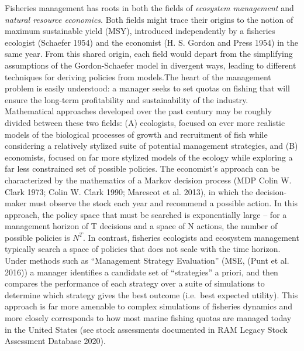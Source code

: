 \documentclass{article}
\begin{document}
Fisheries management has roots in both the fields of \emph{ecosystem
management} and \emph{natural resource economics}. Both fields might
trace their origins to the notion of maximum sustainable yield (MSY),
introduced independently by a fisheries ecologist (Schaefer 1954) and
the economist (H. S. Gordon and Press 1954) in the same year. From this
shared origin, each field would depart from the simplifying assumptions
of the Gordon-Schaefer model in divergent ways, leading to different
techniques for deriving policies from models.The heart of the management
problem is easily understood: a manager seeks to set quotas on fishing
that will ensure the long-term profitability and sustainability of the
industry. Mathematical approaches developed over the past century may be
roughly divided between these two fields: (A) ecologists, focused on
ever more realistic models of the biological processes of growth and
recruitment of fish while considering a relatively stylized suite of
potential management strategies, and (B) economists, focused on far more
stylized models of the ecology while exploring a far less constrained
set of possible policies. The economist's approach can be characterized
by the mathematics of a Markov decision process (MDP Colin W. Clark
1973; Colin W. Clark 1990; Marescot et al. 2013), in which the
decision-maker must observe the stock each year and recommend a possible
action. In this approach, the policy space that must be searched is
exponentially large -- for a management horizon of T decisions and a
space of N actions, the number of possible policies is \(N^T\). In
contrast, fisheries ecologists and ecosystem management typically search
a space of policies that does not scale with the time horizon. Under
methods such as ``Management Strategy Evaluation'' (MSE, (Punt et al.
2016)) a manager identifies a candidate set of ``strategies'' a priori,
and then compares the performance of each strategy over a suite of
simulations to determine which strategy gives the best outcome
(i.e.~best expected utility). This approach is far more amenable to
complex simulations of fisheries dynamics and more closely corresponds
to how most marine fishing quotas are managed today in the United States
(see stock assessments documented in RAM Legacy Stock Assessment
Database 2020).
\end{document}

